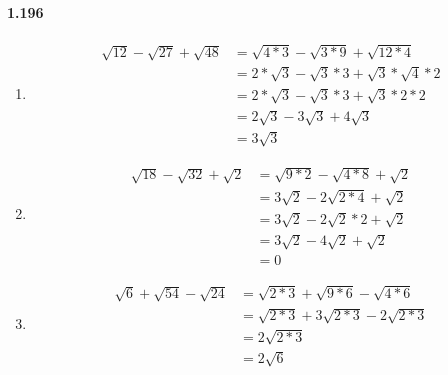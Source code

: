 \documentclass{article}
\newcommand\litem[1]{\item{\bfseries#1\space}}
\begin{document}
\paragraph{1.196}
\begin{enumerate}[label=\emph{\alph*})]
\litem{
  \begin{align*}
    \sqrt{12} - \sqrt{27} + \sqrt{48} &= \sqrt{4 * 3} - \sqrt{3 * 9} + \sqrt{12 * 4} \\ 
    &= 2 * \sqrt{3} - \sqrt{3} * 3 + \sqrt{3} * \sqrt{4} * 2 \\
    &= 2 * \sqrt{3} - \sqrt{3} * 3 + \sqrt{3} * 2 * 2 \\
    &= 2\sqrt{3} - 3\sqrt{3} + 4\sqrt{3} \\
    &= 3\sqrt{3}
  \end{align*}
  }
\litem{
  \begin{align*}
    \sqrt{18} - \sqrt{32} + \sqrt{2} &= \sqrt{9 * 2} - \sqrt{4 * 8} + \sqrt{2} \\
    &= 3\sqrt{2} - 2\sqrt{2 * 4} + \sqrt{2} \\
    &= 3\sqrt{2} - 2\sqrt{2} * 2 + \sqrt{2} \\
    &= 3\sqrt{2} - 4\sqrt{2} + \sqrt{2} \\
    &= 0 
  \end{align*}
  }
\litem{
\begin{align*}
    \sqrt{6} + \sqrt{54} - \sqrt{24} &= \sqrt{2 * 3} + \sqrt{9 * 6} - \sqrt{4 * 6} \\
    &= \sqrt{2 * 3} + 3\sqrt{2 * 3} - 2\sqrt{2 * 3} \\
    &= 2\sqrt{2 * 3} \\
    &= 2\sqrt{6}
\end{align*}
}
\end{enumerate}
\end{document}

